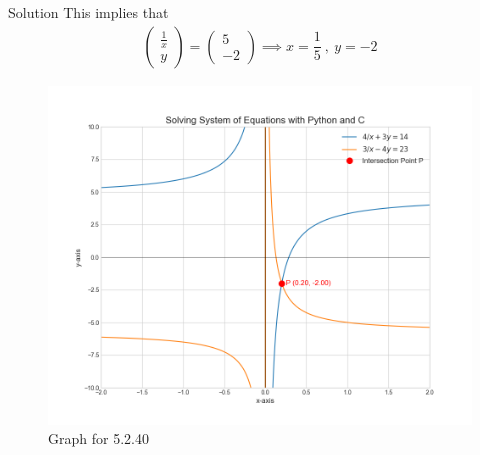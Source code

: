 \documentclass{beamer}
\theoremstyle{remark}
\newcommand{\myvec}[1]{\ensuremath{\begin{pmatrix}#1\end{pmatrix}}}
\begin{document}
\begin{frame}{Solution}
This implies that
\begin{align}
    \myvec{\frac{1}{x} \\ y} = \myvec{5 \\ -2}\implies x=\dfrac{1}{5} \ , \ y=-2
\end{align}
\begin{figure}[H]
    \centering
    \includegraphics[width=0.5\columnwidth]{figs/1.png}
    \caption{Graph for 5.2.40}
    \label{fig:placeholder}
\end{figure}  
\end{frame}
\end{document}
